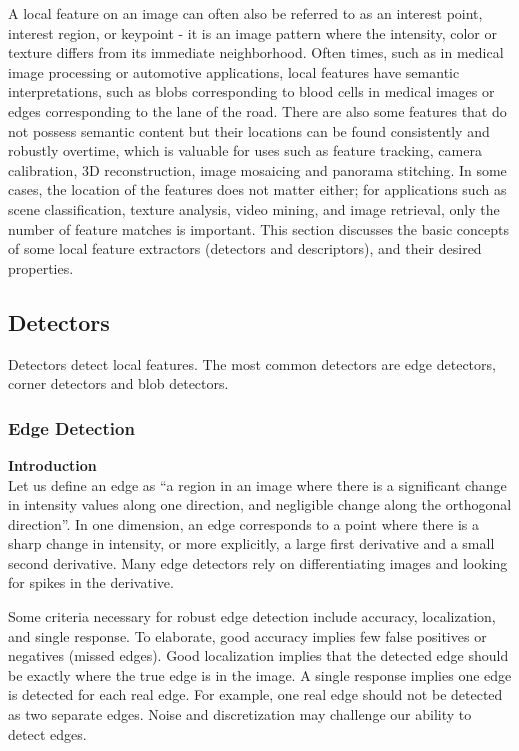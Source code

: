 \documentclass[twoside]{article}
\begin{document}
A local feature on an image can often also be referred to as an interest point, interest region, or keypoint - it is an image pattern where the intensity, color or texture differs from its immediate neighborhood. Often times, such as in medical image processing or automotive applications, local features have semantic interpretations, such as blobs corresponding to blood cells in medical images or edges corresponding to the lane of the road. There are also some features that do not possess semantic content but their locations can be found consistently and robustly overtime, which is valuable for uses such as feature tracking, camera calibration, 3D reconstruction, image mosaicing and panorama stitching. In some cases, the location of the features does not matter either; for applications such as scene classification, texture analysis, video mining, and image retrieval, only the number of feature matches is important. This section discusses the basic concepts of some local feature extractors (detectors and descriptors), and their desired properties.

\subsection{Detectors}
Detectors detect local features. The most common detectors are edge detectors, corner detectors and blob detectors.
\subsubsection{Edge Detection}
\textbf{Introduction}\\
Let us define an edge as ``a region in an image where there is a significant change in intensity values along one direction, and negligible change along the orthogonal direction''. In one dimension, an edge corresponds to a point where there is a sharp change in intensity, or more explicitly, a large first derivative and a small second derivative. Many edge detectors rely on differentiating images and looking for spikes in the derivative.

Some criteria necessary for robust edge detection include accuracy, localization, and single response. To elaborate, good accuracy implies few false positives or negatives (missed edges). Good localization implies that the detected edge should be exactly where the true edge is in the image. A single response implies one edge is detected for each real edge. For example, one real edge should not be detected as two separate edges. Noise and discretization may challenge our ability to detect edges.
\end{document}
